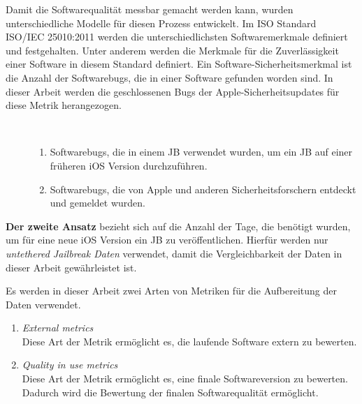 Damit die Softwarequalität messbar gemacht werden kann, wurden unterschiedliche Modelle für diesen Prozess entwickelt. Im ISO Standard ISO/IEC 25010:2011 werden die unterschiedlichsten Softwaremerkmale definiert und festgehalten. \cite{IOS25010} Unter anderem werden die Merkmale für die Zuverlässigkeit einer Software in diesem Standard definiert. Ein Software-Sicherheitsmerkmal ist die Anzahl der Softwarebugs, die in einer Software gefunden worden sind. In dieser Arbeit werden die geschlossenen Bugs der Apple-Sicherheitsupdates für diese Metrik herangezogen.
\begin{description}
    \item[\parbox{\textwidth} {In dieser Arbeit werden zwei Arten von Bugs unterschieden, die in den iOS Sicherheitsupdates geschlossen werden}]~\par
    \begin{enumerate}
        \item Softwarebugs, die in einem JB verwendet wurden, um ein JB auf einer früheren iOS Version durchzuführen. 
        \item Softwarebugs, die von Apple und anderen Sicherheitsforschern entdeckt und gemeldet wurden.
    \end{enumerate}
\end{description} 
 \par
\textbf{Der zweite Ansatz} bezieht sich auf die Anzahl der Tage, die benötigt wurden, um für eine neue iOS Version ein JB zu veröffentlichen. Hierfür werden nur \textit{\glqq untethered Jailbreak Daten\grqq{}} verwendet, damit die Vergleichbarkeit der Daten in dieser Arbeit gewährleistet ist.\par 
\newpage
Es werden in dieser Arbeit zwei Arten von Metriken für die Aufbereitung der Daten verwendet.
\begin{enumerate}
    \item \textit{\glqq External metrics\grqq{}}\\
    Diese Art der Metrik ermöglicht es, die laufende Software extern zu bewerten.
    \item \textit{\glqq Quality in use metrics\grqq{}} \\
    Diese Art der Metrik ermöglicht es, eine finale Softwareversion zu bewerten. Dadurch wird die Bewertung der finalen Softwarequalität ermöglicht.
\end{enumerate}


